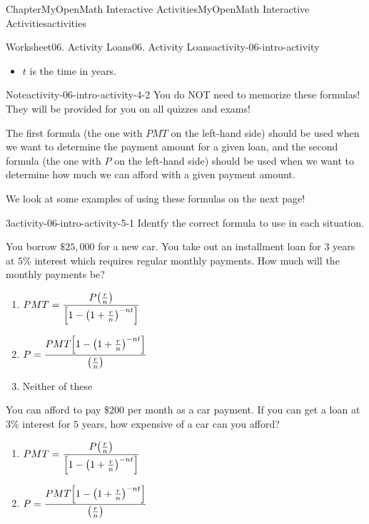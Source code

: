 \documentclass[oneside,10pt,]{book}
\newcommand{\ptxlistdisc}{\raisebox{0.3ex}{\textbullet}}
\begin{document}
\begin{chapterptx}{Chapter}{MyOpenMath Interactive Activities}{}{MyOpenMath Interactive Activities}{}{}{activities}
\begin{worksheet-section}{Worksheet}{06. Activity Loans}{}{06. Activity Loans}{}{}{activity-06-intro-activity}
\begin{itemize}[label=\ptxlistdisc]
\item{}\(t\) is the time in years.%
\end{itemize}
%
\begin{note}{Note}{}{activity-06-intro-activity-4-2}%
You do NOT need to memorize these formulas! They will be provided for you on all quizzes and exams!%
\end{note}
The first formula (the one with \(PMT\) on the left-hand side) should be used when we want to determine the payment amount for a given loan, and the second formula (the one with \(P\) on the left-hand side) should be used when we want to determine how much we can afford with a given payment amount.%
\par
We look at some examples of using these formulas on the next page!%
\clearpage
\begin{divisionexercise}{3}{}{}{activity-06-intro-activity-5-1}%
Identfy the correct formula to use in each situation.%
\par
You borrow \(\displaystyle\${25},{000}\) for a new car. You take out an installment loan for \(\displaystyle{3}\) years at \(\displaystyle{5}\%\) interest which requires regular monthly payments. How much will the monthly payments be?%
\par
%
\begin{enumerate}[label={(\alph*)}]
\item{}\(\displaystyle \displaystyle{P}{M}{T}=\frac{{{P}{\left(\frac{{r}}{{n}}\right)}}}{{{\left[{1}-{\left({1}+\frac{{r}}{{n}}\right)}^{{-{n}{t}}}\right]}}}\)%
\item{}\(\displaystyle \displaystyle{P}=\frac{{{P}{M}{T}{\left[{1}-{\left({1}+\frac{{r}}{{n}}\right)}^{{-{n}{t}}}\right]}}}{{{\left(\frac{{r}}{{n}}\right)}}}\)%
\item{}Neither of these%
\end{enumerate}
%
\par
You can afford to pay \(\displaystyle\${200}\) per month as a car payment. If you can get a loan at \(\displaystyle{3}\%\) interest for \(\displaystyle{5}\) years, how expensive of a car can you afford?%
\par
%
\begin{enumerate}[label={(\alph*)}]
\item{}\(\displaystyle \displaystyle{P}{M}{T}=\frac{{{P}{\left(\frac{{r}}{{n}}\right)}}}{{{\left[{1}-{\left({1}+\frac{{r}}{{n}}\right)}^{{-{n}{t}}}\right]}}}\)%
\item{}\(\displaystyle \displaystyle{P}=\frac{{{P}{M}{T}{\left[{1}-{\left({1}+\frac{{r}}{{n}}\right)}^{{-{n}{t}}}\right]}}}{{{\left(\frac{{r}}{{n}}\right)}}}\)%

\end{enumerate}
\end{divisionexercise}
\end{worksheet-section}
\end{chapterptx}
\end{document}
